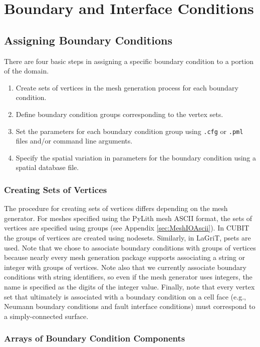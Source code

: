 
\chapter{\label{cha:boundary:interface:conditions}Boundary and Interface
Conditions}


\section{Assigning Boundary Conditions}

There are four basic steps in assigning a specific boundary condition
to a portion of the domain.
\begin{enumerate}
\item Create sets of vertices in the mesh generation process for each boundary
condition.
\item Define boundary condition groups corresponding to the vertex sets.
\item Set the parameters for each boundary condition group using \texttt{.cfg}
or \texttt{.pml} files and/or command line arguments.
\item Specify the spatial variation in parameters for the boundary condition
using a spatial database file.
\end{enumerate}

\subsection{Creating Sets of Vertices}

The procedure for creating sets of vertices differs depending on the
mesh generator. For meshes specified using the PyLith mesh ASCII format,
the sets of vertices are specified using groups (see Appendix \vref{sec:MeshIOAscii}).
In CUBIT the groups of vertices are created using nodesets. Similarly,
in LaGriT, psets are used. Note that we chose to associate boundary
conditions with groups of vertices because nearly every mesh generation
package supports associating a string or integer with groups of vertices.
Note also that we currently associate boundary conditions with string
identifiers, so even if the mesh generator uses integers, the name
is specified as the digits of the integer value. Finally, note that
every vertex set that ultimately is associated with a boundary condition
on a cell face (e.g., Neumann boundary conditions and fault interface
conditions) must correspond to a simply-connected surface.


\subsection{Arrays of Boundary Condition Components}

